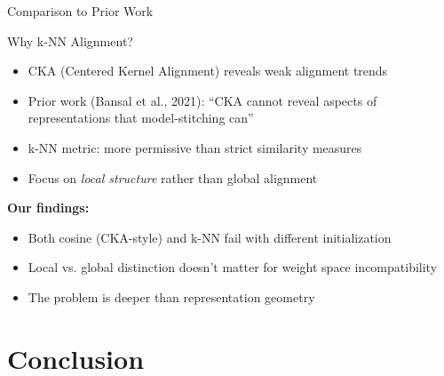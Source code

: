 \documentclass{beamer}
\begin{document}
\begin{frame}{Comparison to Prior Work}

\begin{block}{Why k-NN Alignment?}
\begin{itemize}
    \item CKA (Centered Kernel Alignment) reveals weak alignment trends
    \item Prior work (Bansal et al., 2021): ``CKA cannot reveal aspects of representations that model-stitching can''
    \item k-NN metric: more permissive than strict similarity measures
    \item Focus on \emph{local structure} rather than global alignment
\end{itemize}
\end{block}

\vspace{0.5em}

\textbf{Our findings:}
\begin{itemize}
    \item Both cosine (CKA-style) and k-NN fail with different initialization
    \item Local vs. global distinction doesn't matter for weight space incompatibility
    \item The problem is deeper than representation geometry
\end{itemize}

\end{frame}

\section{Conclusion}
\end{document}
